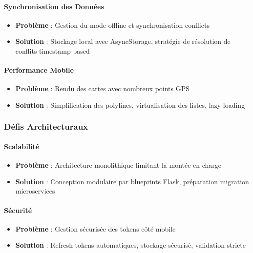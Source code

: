 \paragraph{Synchronisation des Données}
\begin{itemize}
    \item \textbf{Problème} : Gestion du mode offline et synchronisation conflicts
    \item \textbf{Solution} : Stockage local avec AsyncStorage, stratégie de résolution de conflits timestamp-based
\end{itemize}

\paragraph{Performance Mobile}
\begin{itemize}
    \item \textbf{Problème} : Rendu des cartes avec nombreux points GPS
    \item \textbf{Solution} : Simplification des polylines, virtualisation des listes, lazy loading
\end{itemize}

\subsubsection{Défis Architecturaux}

\paragraph{Scalabilité}
\begin{itemize}
    \item \textbf{Problème} : Architecture monolithique limitant la montée en charge
    \item \textbf{Solution} : Conception modulaire par blueprints Flask, préparation migration microservices
\end{itemize}

\paragraph{Sécurité}
\begin{itemize}
    \item \textbf{Problème} : Gestion sécurisée des tokens côté mobile
    \item \textbf{Solution} : Refresh tokens automatiques, stockage sécurisé, validation stricte
\end{itemize}


